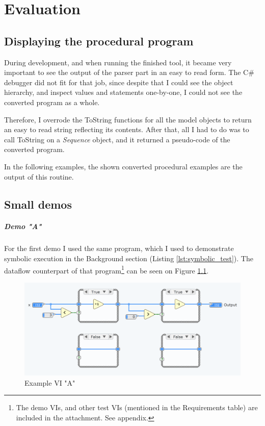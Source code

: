 \chapter{Evaluation}
\section{Displaying the procedural program}
During development, and when running the finished tool, it became very important to see the output of the parser part in an easy to read form. The C\# debugger did not fit for that job, since despite that I could see the object hierarchy, and inspect values and statements one-by-one, I could not see the converted program as a whole. 

Therefore, I overrode the ToString functions for all the model objects to return an easy to read string reflecting its contents. After that, all I had to do was to call ToString on a \textit{Sequence} object, and it returned a pseudo-code of the converted program.

In the following examples, the shown converted procedural examples are the output of this routine.
\section{Small demos}
\paragraph{Demo "A"}
For the first demo I used the same program, which I used to demonstrate symbolic execution in the Background section (Listing \ref{lst:symbolic_test}). The dataflow counterpart of that program\footnote{The demo VIs, and other test VIs (mentioned in the Requirements table) are included in the attachment. See appendix.} can be seen on Figure \ref{fig:testvi1}.
\begin{figure}
\centering
\includegraphics[width=150mm,keepaspectratio]{figures/testvi1.png}
\caption{Example VI "A"} 
\label{fig:testvi1}
\end{figure}

